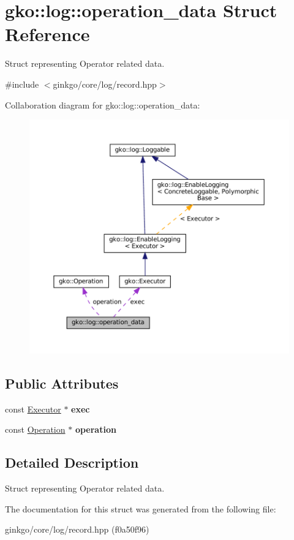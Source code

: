 \hypertarget{structgko_1_1log_1_1operation__data}{}\section{gko\+:\+:log\+:\+:operation\+\_\+data Struct Reference}
\label{structgko_1_1log_1_1operation__data}


Struct representing Operator related data.  




{\ttfamily \#include $<$ginkgo/core/log/record.\+hpp$>$}



Collaboration diagram for gko\+:\+:log\+:\+:operation\+\_\+data\+:
\nopagebreak
\begin{figure}[H]
\begin{center}
\leavevmode
\includegraphics[width=350pt]{structgko_1_1log_1_1operation__data__coll__graph}
\end{center}
\end{figure}
\subsection*{Public Attributes}
\begin{DoxyCompactItemize}
\item 
\mbox{\label{structgko_1_1log_1_1operation__data_ad5a3a3e76a8dc5b8ca240084585fd6e7}} 
const \hyperlink{classgko_1_1Executor}{Executor} $\ast$ {\bfseries exec}
\item 
\mbox{\label{structgko_1_1log_1_1operation__data_a92dc7de984a101b8f93a05d3f3502d7c}} 
const \hyperlink{classgko_1_1Operation}{Operation} $\ast$ {\bfseries operation}
\end{DoxyCompactItemize}


\subsection{Detailed Description}
Struct representing Operator related data. 

The documentation for this struct was generated from the following file\+:\begin{DoxyCompactItemize}
\item 
ginkgo/core/log/record.\+hpp (f0a50f96)\end{DoxyCompactItemize}
